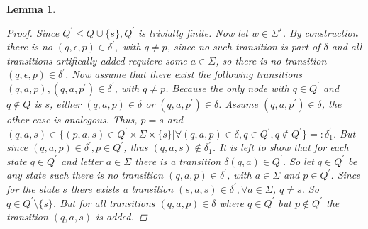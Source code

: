 \documentclass[10pt]{article}
\theoremstyle{definition}
\theoremstyle{plain}
\newtheorem{lemma}{Lemma}
\theoremstyle{remark}
\begin{document}
\begin{lemma}
\begin{proof}
      Since $Q^\prime \leq Q \cup \{s\}, Q^\prime$ is trivially finite. Now let
      $w\in \Sigma^\star$. By construction there is no $(q,\epsilon,p)\in
      \delta^\prime,$ with $q\neq p$, since no such transition is part of $\delta$ and all
      transitions artifically added requiere some $a\in \Sigma$, so there is no
      transition $(q,\epsilon,p)\in \delta^\prime$.
      Now assume that there exist the following transitions
      $(q,a,p),(q,a,p^\prime)\in \delta^\prime$, with $q\neq p$. Because the
      only node with $q\in Q^\prime$ and $q\not\in Q$ is $s$, either $(q,a,p)\in
      \delta$ or $(q,a,p^\prime)\in \delta$. Assume $(q,a,p^\prime)\in\delta$,
      the other case is analogous. Thus, $p=s$ and $(q,a,s)\in\{(p,a,s)\in 
      Q^\prime \times \Sigma \times \{s\} | \forall (q,a,p)\in \delta, q\in Q^\prime, q\not
      \in Q^\prime\}=:\delta_1^\prime$. But since $(q,a,p)\in \delta^\prime,p\in
      Q^\prime$, thus $(q,a,s)\not\in\delta_1^\prime$. It is left to show that
      for each state $q\in Q^\prime$ and letter $a\in \Sigma$ there is a
      transition $\delta(q,a)\in Q^\prime$.
      So let $q\in Q^\prime$ be any state such there is no transition
      $(q,a,p)\in\delta^\prime$, with $a\in \Sigma$ and $p\in Q^\prime$. Since
      for the state $s$ there exists a transition $(s,a,s)\in \delta^\prime,
      \forall a\in \Sigma$, $q\neq s$. So $q\in Q^\prime\setminus\{s\}$. But for
      all transitions $(q,a,p)\in \delta$ where $q\in Q^\prime$ but $p\not \in
      Q^\prime$ the transition $(q,a,s)$ is added.
      


%
      
    \end{proof}
  \end{lemma}
  
\end{document}
